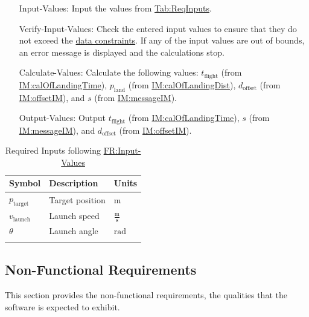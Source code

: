 \documentclass[12pt]{article}
\begin{document}
\begin{itemize}
\item[Input-Values:\phantomsection\label{inputValues}]{Input the values from \hyperref[Table:ReqInputs]{Tab:ReqInputs}.}
\item[Verify-Input-Values:\phantomsection\label{verifyInVals}]{Check the entered input values to ensure that they do not exceed the \hyperref[Sec:DataConstraints]{data constraints}. If any of the input values are out of bounds, an error message is displayed and the calculations stop.}
\item[Calculate-Values:\phantomsection\label{calcValues}]{Calculate the following values: ${t_{\text{flight}}}$ (from \hyperref[IM:calOfLandingTime]{IM:calOfLandingTime}), ${p_{\text{land}}}$ (from \hyperref[IM:calOfLandingDist]{IM:calOfLandingDist}), ${d_{\text{offset}}}$ (from \hyperref[IM:offsetIM]{IM:offsetIM}), and $s$ (from \hyperref[IM:messageIM]{IM:messageIM}).}
\item[Output-Values:\phantomsection\label{outputValues}]{Output ${t_{\text{flight}}}$ (from \hyperref[IM:calOfLandingTime]{IM:calOfLandingTime}), $s$ (from \hyperref[IM:messageIM]{IM:messageIM}), and ${d_{\text{offset}}}$ (from \hyperref[IM:offsetIM]{IM:offsetIM}).}
\end{itemize}
\begin{longtable}{l l l}
\toprule
\textbf{Symbol} & \textbf{Description} & \textbf{Units}
\\
\midrule
\endhead
${p_{\text{target}}}$ & Target position & ${\text{m}}$
\\
${v_{\text{launch}}}$ & Launch speed & $\frac{\text{m}}{\text{s}}$
\\
$θ$ & Launch angle & ${\text{rad}}$
\\
\bottomrule
\caption{Required Inputs following \hyperref[inputValues]{FR:Input-Values}}
\label{Table:ReqInputs}
\end{longtable}
\subsection{Non-Functional Requirements}
\label{Sec:NFRs}
This section provides the non-functional requirements, the qualities that the software is expected to exhibit.
\end{document}
